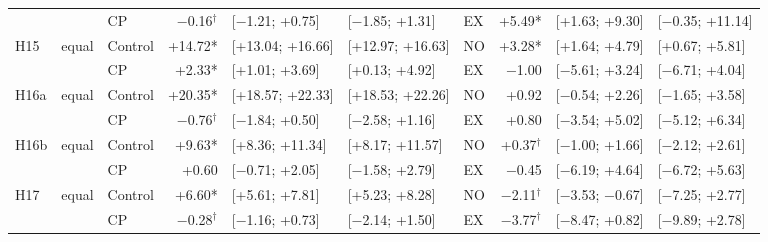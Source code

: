 \begin{table}[H]
{\begin{tabular}{@{}l l l r l l | l r l l@{}}
 & & CP & $-$0.16$^\dagger$ & [$-$1.21; +0.75] & [$-$1.85; +1.31] & EX & +5.49* & [+1.63; +9.30] & [$-$0.35; +11.14] \\
H15 & equal & Control & +14.72* & [+13.04; +16.66] & [+12.97; +16.63] & NO & +3.28* & [+1.64; +4.79] & [+0.67; +5.81] \\
 & & CP & +2.33* & [+1.01; +3.69] & [+0.13; +4.92] & EX & $-$1.00 & [$-$5.61; +3.24] & [$-$6.71; +4.04] \\
H16a & equal & Control & +20.35* & [+18.57; +22.33] & [+18.53; +22.26] & NO & +0.92 & [$-$0.54; +2.26] & [$-$1.65; +3.58] \\
 & & CP & $-$0.76$^\dagger$ & [$-$1.84; +0.50] & [$-$2.58; +1.16] & EX & +0.80 & [$-$3.54; +5.02] & [$-$5.12; +6.34] \\
H16b & equal & Control & +9.63* & [+8.36; +11.34] & [+8.17; +11.57] & NO & +0.37$^\dagger$ & [$-$1.00; +1.66] & [$-$2.12; +2.61] \\
 & & CP & +0.60 & [$-$0.71; +2.05] & [$-$1.58; +2.79] & EX & $-$0.45 & [$-$6.19; +4.64] & [$-$6.72; +5.63] \\
H17 & equal & Control & +6.60* & [+5.61; +7.81] & [+5.23; +8.28] & NO & $-$2.11$^\dagger$ & [$-$3.53; $-$0.67] & [$-$7.25; +2.77] \\
 & & CP & $-$0.28$^\dagger$ & [$-$1.16; +0.73] & [$-$2.14; +1.50] & EX & $-$3.77$^\dagger$ & [$-$8.47; +0.82] & [$-$9.89; +2.78] \\
\bottomrule\end{tabular}}\end{table}
